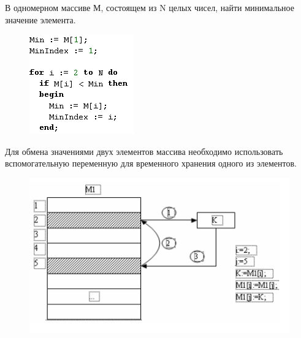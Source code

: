 \documentclass{beamer}
\begin{document}
\begin{frame}
В одномерном массиве М, состоящем из N целых чисел, найти минимальное значение элемента.
\begin{figure}[h]
\centering
\includegraphics[scale=1.0]{images/array_min_code.png}
\label{pic-search-code}
\end{figure}
\end{frame}

\begin{frame}
Для обмена значениями двух элементов массива необходимо использовать вспомогательную переменную для временного хранения одного из элементов.
\begin{figure}[h]
\centering
\includegraphics[scale=0.8]{images/array_swap.png}
\label{pic-search-swap}
\end{figure}
\end{frame}
\end{document}
